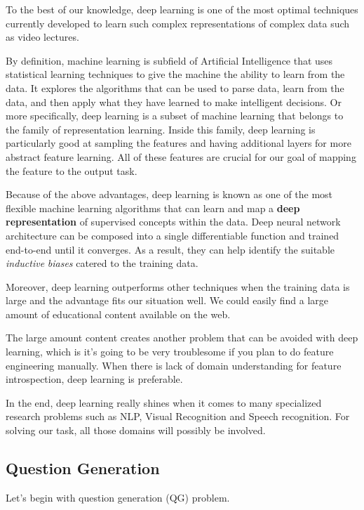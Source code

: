 \documentclass[]{book}
\theoremstyle{definition}
\theoremstyle{definition}
\theoremstyle{definition}
\theoremstyle{remark}
\begin{document}
To the best of our knowledge, deep learning is one of the most optimal
techniques currently developed to learn such complex representations of
complex data such as video lectures.

By definition, machine learning is subfield of Artificial Intelligence
that uses statistical learning techniques to give the machine the
ability to learn from the data. It explores the algorithms that can be
used to parse data, learn from the data, and then apply what they have
learned to make intelligent decisions. Or more specifically, deep
learning is a subset of machine learning that belongs to the family of
representation learning. Inside this family, deep learning is
particularly good at sampling the features and having additional layers
for more abstract feature learning. All of these features are crucial
for our goal of mapping the feature to the output task.

Because of the above advantages, deep learning is known as one of the
most flexible machine learning algorithms that can learn and map a
\textbf{deep representation} of supervised concepts within the data.
Deep neural network architecture can be composed into a single
differentiable function and trained end-to-end until it converges. As a
result, they can help identify the suitable \emph{inductive}
\emph{biases} catered to the training data.

Moreover, deep learning outperforms other techniques when the training
data is large and the advantage fits our situation well. We could easily
find a large amount of educational content available on the web.

The large amount content creates another problem that can be avoided
with deep learning, which is it's going to be very troublesome if you
plan to do feature engineering manually. When there is lack of domain
understanding for feature introspection, deep learning is preferable.

In the end, deep learning really shines when it comes to many
specialized research problems such as NLP, Visual Recognition and Speech
recognition. For solving our task, all those domains will possibly be
involved.

\subsection{Question Generation}\label{question-generation}

Let's begin with question generation (QG) problem.
\end{document}
